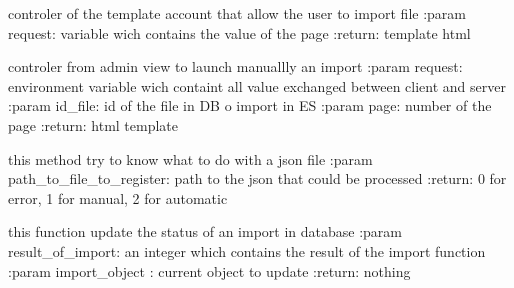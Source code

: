 \documentclass[letterpaper,10pt,english]{sphinxmanual}
\begin{document}
\begin{fulllineitems}
\label{\detokenize{QuChemPedIA.views:QuChemPedIA.views.importView.import_view}}
controler of the template account that allow the user to import file
:param request: variable wich contains the value of the page
:return: template html

\end{fulllineitems}


\begin{fulllineitems}
\label{\detokenize{QuChemPedIA.views:QuChemPedIA.views.importView.launch_import}}
controler from admin view to launch manuallly an import
:param request: environment variable wich containt all value exchanged between client and server
:param id\_file: id of the file in DB o import in ES
:param page: number of the page
:return: html template

\end{fulllineitems}


\begin{fulllineitems}
\label{\detokenize{QuChemPedIA.views:QuChemPedIA.views.importView.register_soft_job_type_and_version}}
this method try to know what to do with a json file
:param path\_to\_file\_to\_register: path to the json that could be processed
:return: 0 for error, 1 for manual, 2 for automatic

\end{fulllineitems}


\begin{fulllineitems}
\label{\detokenize{QuChemPedIA.views:QuChemPedIA.views.importView.update_status_in_db}}
this function update the status of an import in database
:param result\_of\_import: an integer which contains the result of the import function
:param import\_object : current object to update
:return: nothing

\end{fulllineitems}
\end{document}
